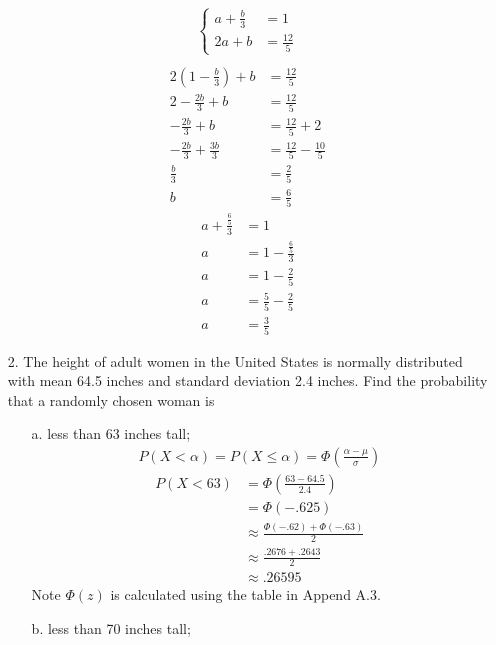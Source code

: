 \documentclass[letterpaper,12pt]{article}
\begin{document}
\begin{enumerate}
\begin{align*}
\begin{cases}
        a + \frac{b}{3} &= 1 \\
        2a + b &= \frac{12}{5}
      \end{cases} \\
    \end{align*}
    \begin{align*}
      2\left(1 - \frac{b}{3}\right) + b &= \frac{12}{5} \\
      2 - \frac{2b}{3} + b &= \frac{12}{5} \\
      -\frac{2b}{3} + b &= \frac{12}{5} + 2 \\
      -\frac{2b}{3} + \frac{3b}{3} &= \frac{12}{5} - \frac{10}{5} \\
      \frac{b}{3} &= \frac{2}{5} \\
      b &= \frac{6}{5}
    \end{align*}
    \begin{align*}
      a + \frac{\frac{6}{5}}{3} &= 1 \\
      a &= 1 - \frac{\frac{6}{5}}{3} \\
      a &= 1 - \frac{2}{5} \\
      a &= \frac{5}{5} - \frac{2}{5} \\
      a &= \frac{3}{5}
    \end{align*}
  \item[2.]
    The height of adult women in the United States is normally distributed with mean 64.5 inches and standard deviation 2.4 inches. Find the probability that a randomly chosen woman is
    \begin{enumerate}
      \item[a.]
        less than 63 inches tall;
        \begin{align*}
          P(X < \alpha) = P(X \le \alpha) = \Phi\left(\frac{\alpha - \mu}{\sigma}\right)
        \end{align*}
        \begin{align*}
          P(X < 63) &= \Phi\left(\frac{63 - 64.5}{2.4}\right) \\
          &= \Phi(-.625) \\
          &\approx \frac{\Phi(-.62) + \Phi(-.63)}{2} \\
          &\approx \frac{.2676 + .2643}{2} \\
          &\approx .26595
        \end{align*}
        Note $\Phi(z)$ is calculated using the table in Append A.3.
      \item[b.]
        less than 70 inches tall;
        \begin{align*}

\end{align*}
\end{enumerate}
\end{enumerate}
\end{document}
